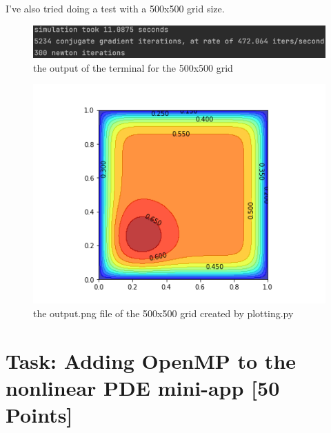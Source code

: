 \documentclass[unicode,11pt,a4paper,oneside,numbers=endperiod,openany]{scrartcl}
\begin{document}
I've also tried doing a test with a 500x500 grid size.
\begin{figure}[H]
\centering
\includegraphics[width=0.7\linewidth]{terminal500.png}
\caption{the output of the terminal for the 500x500 grid}
\end{figure}
\begin{figure}[H]
\centering
\includegraphics[width=0.7\linewidth]{output500.png}
\caption{the output.png file of the 500x500 grid created by plotting.py}
\end{figure}


\section{Task:  Adding OpenMP to the nonlinear PDE mini-app [50 Points]}
\end{document}
